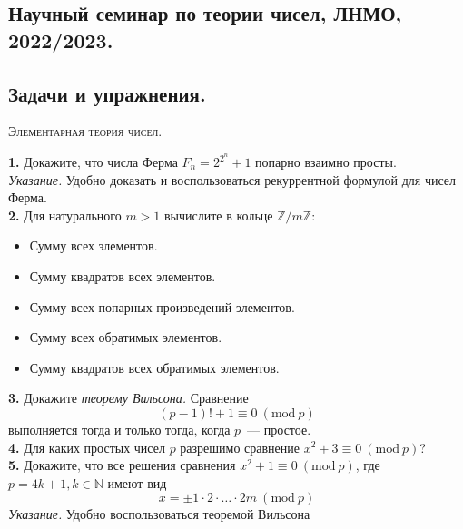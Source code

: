 \documentclass[a4, 12pt]{article}
\renewcommand{\bf}{\textbf}
\newcommand{\Mod}[1]{\ (\mathrm{mod}\ #1)}
\begin{document}
\begin{center}
\section*{Научный семинар по теории чисел, ЛНМО, 2022/2023.}
\subsection*{Задачи и упражнения.}
\end{center}
\begin{center}
    \textsc{Элементарная теория чисел.}
\end{center}

\bf{1.} Докажите, что числа Ферма $F_n = 2^{2^n} + 1$ попарно взаимно просты. \\
\emph{Указание.} Удобно доказать и воспользоваться рекуррентной формулой для чисел Ферма. \\

\bf{2.} Для натурального $m > 1$ вычислите в кольце $\mathbb{Z}/m\mathbb{Z}$:
\begin{itemize}
    \item Сумму всех элементов.
    \item Сумму квадратов всех элементов.
    \item Сумму всех попарных произведений  элементов.
    \item Сумму всех обратимых элементов.
    \item Сумму квадратов всех обратимых элементов.
\end{itemize}

\bf{3.} Докажите \emph{теорему Вильсона.} Сравнение
\[ (p - 1)! + 1 \equiv 0 \Mod{p} \]
выполняется тогда и только тогда, когда $p$~---  простое. \\

\bf{4.} Для каких простых чисел $p$ разрешимо сравнение $x^2 + 3 \equiv 0 \Mod{p}$?\\

\bf{5.} Докажите, что все решения сравнения $x^2 + 1 \equiv 0 \Mod{p}$, где $p = 4k + 1, k \in \mathbb{N}$ имеют вид
\[ x = \pm 1 \cdot 2 \cdot \ldots \cdot 2m \Mod{p} \]
\emph{Указание.} Удобно воспользоваться теоремой Вильсона
\end{document}
